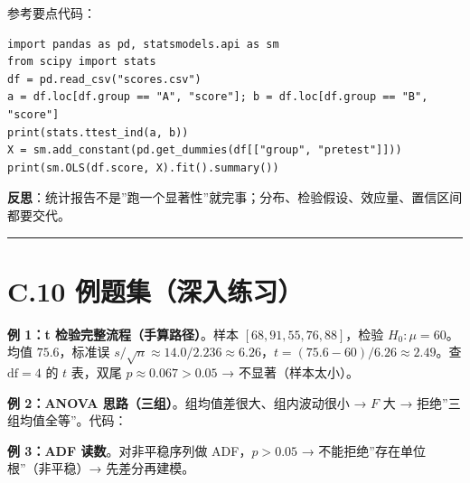 参考要点代码：

\begin{verbatim}
import pandas as pd, statsmodels.api as sm
from scipy import stats
df = pd.read_csv("scores.csv")
a = df.loc[df.group == "A", "score"]; b = df.loc[df.group == "B", "score"]
print(stats.ttest_ind(a, b))
X = sm.add_constant(pd.get_dummies(df[["group", "pretest"]]))
print(sm.OLS(df.score, X).fit().summary())
\end{verbatim}

\textbf{反思}：统计报告不是''跑一个显著性''就完事；分布、检验假设、效应量、置信区间都要交代。

\begin{center}\rule{0.5\linewidth}{0.5pt}\end{center}

\section{C.10
例题集（深入练习）}\label{c.10-ux4f8bux9898ux96c6ux6df1ux5165ux7ec3ux4e60}

\textbf{例 1：t 检验完整流程（手算路径）}。样本
\([68,91,55,76,88]\)，检验 \(H_0:\mu=60\)。均值 \(75.6\)，标准误
\(s/\sqrt n\approx 14.0/2.236\approx 6.26\)，\(t=(75.6-60)/6.26\approx 2.49\)。查
\(\mathrm{df}=4\) 的 \(t\) 表，双尾 \(p\approx 0.067>0.05\) →
不显著（样本太小）。

\textbf{例 2：ANOVA 思路（三组）}。组均值差很大、组内波动很小 → \(F\) 大
→ 拒绝''三组均值全等''。代码：

\begin{Shaded}
\begin{Highlighting}[]
\OperatorTok{=}\NormalTok{: [}\NormalTok{,}\NormalTok{,}\NormalTok{,}\NormalTok{,}\NormalTok{,}\NormalTok{,}\NormalTok{,}\NormalTok{,}\NormalTok{],}
                   \NormalTok{: [}\NormalTok{]}\OperatorTok{*} \OperatorTok{+}\NormalTok{ [}\NormalTok{]}\OperatorTok{*} \OperatorTok{+}\NormalTok{ [}\NormalTok{]}\OperatorTok{*}\NormalTok{\})}
\OperatorTok{=}
\end{Highlighting}
\end{Shaded}

\textbf{例 3：ADF 读数}。对非平稳序列做 ADF，\(p>0.05\) →
不能拒绝''存在单位根''（非平稳）→ 先差分再建模。
